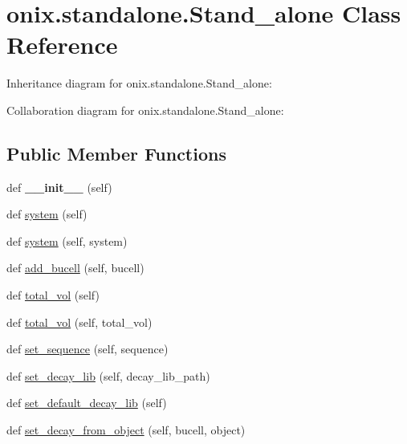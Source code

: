 \hypertarget{classonix_1_1standalone_1_1Stand__alone}{}\section{onix.\+standalone.\+Stand\+\_\+alone Class Reference}
\label{classonix_1_1standalone_1_1Stand__alone}


Inheritance diagram for onix.\+standalone.\+Stand\+\_\+alone\+:


Collaboration diagram for onix.\+standalone.\+Stand\+\_\+alone\+:
\subsection*{Public Member Functions}
\begin{DoxyCompactItemize}
\item 
\mbox{\label{classonix_1_1standalone_1_1Stand__alone_a0337f62cf45aecafa88cab8de2a71b70}} 
def {\bfseries \+\_\+\+\_\+init\+\_\+\+\_\+} (self)
\item 
def \hyperlink{classonix_1_1standalone_1_1Stand__alone_a5daf9b0fa3f638edce64017b5e043dcc}{system} (self)
\item 
def \hyperlink{classonix_1_1standalone_1_1Stand__alone_a5816d85a07f60c443271ecdbcde30bf4}{system} (self, system)
\item 
def \hyperlink{classonix_1_1standalone_1_1Stand__alone_a3ebafe0bbcde144dcff325b1f428ef84}{add\+\_\+bucell} (self, bucell)
\item 
def \hyperlink{classonix_1_1standalone_1_1Stand__alone_a0cb64bc7dd487ea661af433a79fc5255}{total\+\_\+vol} (self)
\item 
def \hyperlink{classonix_1_1standalone_1_1Stand__alone_aca9f0c220bb80f44b3731a6580fc38fa}{total\+\_\+vol} (self, total\+\_\+vol)
\item 
def \hyperlink{classonix_1_1standalone_1_1Stand__alone_a399c649f8541b73b1259865d04ed188f}{set\+\_\+sequence} (self, sequence)
\item 
def \hyperlink{classonix_1_1standalone_1_1Stand__alone_a5c99385b9f1b717143fb5a21726574fa}{set\+\_\+decay\+\_\+lib} (self, decay\+\_\+lib\+\_\+path)
\item 
def \hyperlink{classonix_1_1standalone_1_1Stand__alone_aeac69ab322ac6f76315302cef654a577}{set\+\_\+default\+\_\+decay\+\_\+lib} (self)
\item 
def \hyperlink{classonix_1_1standalone_1_1Stand__alone_a06089a39d5d97afb96518626fdd0eae9}{set\+\_\+decay\+\_\+from\+\_\+object} (self, bucell, object)

\end{DoxyCompactItemize}
